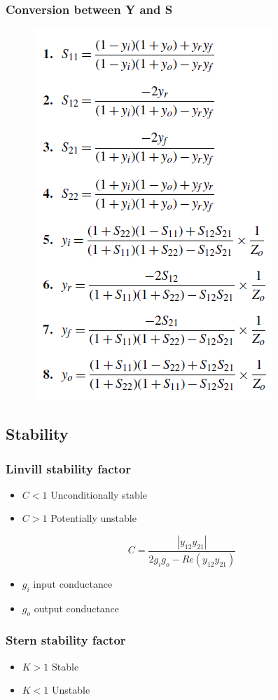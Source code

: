 \subsubsection{Conversion between Y and S}
\begin{figure} [H]
	\includegraphics[width=0.5\linewidth]{graphics/39.png}
\end{figure}

\subsection{Stability}
\subsubsection{Linvill stability factor}
\begin{itemize}
	\item $C < 1$ Unconditionally stable
	\item $C > 1$ Potentially unstable
\end{itemize}

\begin{equation}
C = \dfrac{|y_{12}y_{21}|}{2g_ig_o-Re(y_{12}y_{21})}
\end{equation}

\begin{itemize}
	\item $g_i$ input conductance
	\item $g_o$ output conductance
\end{itemize}

\subsubsection{Stern stability factor}
\begin{itemize}
	\item $K > 1$ Stable
	\item $K < 1$ Unstable
\end{itemize}

